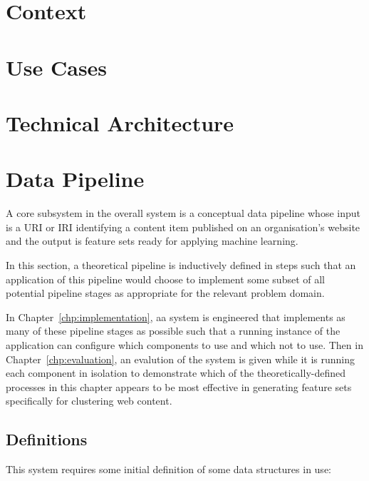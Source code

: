 \documentclass[10pt,a4paper]{report}
\begin{document}
\section{Context}


\section{Use Cases}


\section{Technical Architecture}


\section{Data Pipeline}

A core subsystem in the overall system is a conceptual data pipeline whose
input is a URI or IRI identifying a content item published on an organisation's
website and the output is feature sets ready for applying machine learning.

In this section, a theoretical pipeline is inductively defined in steps such
that an application of this pipeline would choose to implement some subset of
all potential pipeline stages as appropriate for the relevant problem domain.

In Chapter~\ref{chp:implementation}, aa system is engineered that implements
as many of these pipeline stages as possible such that a running instance of
the application can configure which components to use and which not to use.
Then in Chapter~\ref{chp:evaluation}, an evalution of the system is given
while it is running each component in isolation to demonstrate which of the
theoretically-defined processes in this chapter appears to be most effective
in generating feature sets specifically for clustering web content.

\subsection{Definitions}

This system requires some initial definition of some data structures in use:
\end{document}
